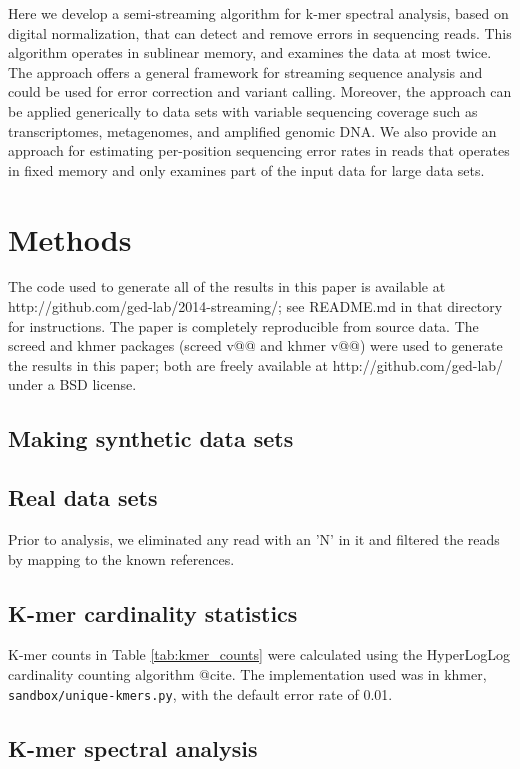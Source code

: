 \documentclass{article}
\begin{document}
Here we develop a semi-streaming algorithm for k-mer spectral
analysis, based on digital normalization, that can detect and remove
errors in sequencing reads.  This algorithm operates in sublinear
memory, and examines the data at most twice.  The approach offers a
general framework for streaming sequence analysis and could be used
for error correction and variant calling.  Moreover, the approach can
be applied generically to data sets with variable sequencing coverage
such as transcriptomes, metagenomes, and amplified genomic DNA.  We
also provide an approach for estimating per-position sequencing error
rates in reads that operates in fixed memory and only examines part of
the input data for large data sets.

\section{Methods}

The code used to generate all of the results in this paper is
available at http://github.com/ged-lab/2014-streaming/; see README.md
in that directory for instructions.  The paper is completely
reproducible from source data.  The screed and khmer packages (screed
v@@ and khmer v@@) were used to generate the results in this paper;
both are freely available at http://github.com/ged-lab/ under a BSD
license.

\subsection{Making synthetic data sets}

\subsection{Real data sets}

Prior to analysis, we eliminated any read with an 'N' in it and
filtered the reads by mapping to the known references.

\subsection{K-mer cardinality statistics}

K-mer counts in Table \ref{tab:kmer_counts} were calculated using
the HyperLogLog cardinality counting algorithm @cite.
The implementation used was in khmer, {\tt sandbox/unique-kmers.py},
with the default error rate of 0.01.

\subsection{K-mer spectral analysis}
\end{document}
